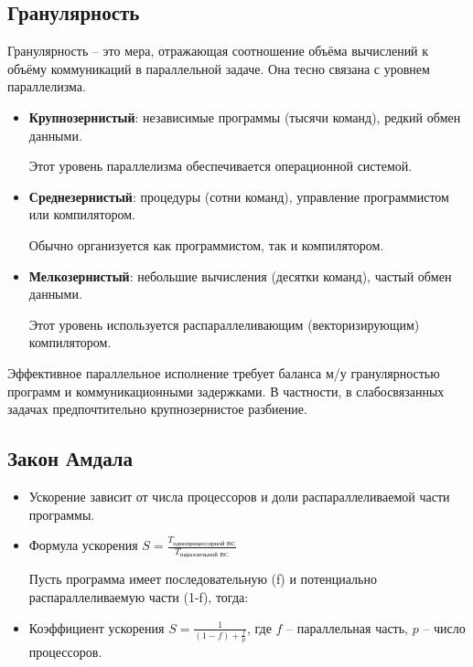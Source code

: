 	\subsection{Гранулярность}
	Гранулярность -- это мера, отражающая соотношение объёма вычислений к объёму коммуникаций в параллельной задаче. Она тесно связана с уровнем параллелизма.
	\begin{itemize}
		\item \textbf{Крупнозернистый}: независимые программы (тысячи команд), редкий обмен данными.
		\par
		Этот уровень параллелизма обеспечивается операционной системой. 
		\item \textbf{Среднезернистый}: процедуры (сотни команд), управление программистом или компилятором.
		\par
		Обычно организуется как программистом, так и компилятором. 
		\item \textbf{Мелкозернистый}: небольшие вычисления (десятки команд), частый обмен данными.
		\par
		Этот уровень используется распараллеливающим (векторизирующим) компилятором.
	\end{itemize}
	
	Эффективное параллельное исполнение требует баланса м/у гранулярностью программ и коммуникационными задержками. В частности, в слабосвязанных задачах предпочтительно крупнозернистое разбиение.
	
	\newpage
	
	\subsection{Закон Амдала}
	\begin{itemize}
		\item Ускорение зависит от числа процессоров и доли распараллеливаемой части программы.
		\item Формула ускорения \( S = \frac{T_{\text{однопроцессорной ВС}}}{T_{\text{параллельной ВС}}} \)
		\par
		Пусть программа имеет последовательную (f) и потенциально распараллеливаемую 
		части (1-f), тогда:
		\par
		\item Коэффициент ускорения \( S = \frac{1}{(1 - f) + \frac{f}{p}} \), где \( f \) -- параллельная часть, \( p \) -- число процессоров.
	\end{itemize}
	
